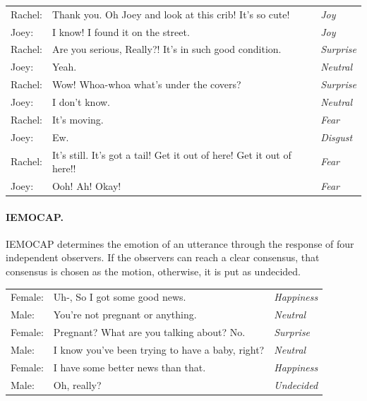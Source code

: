 \documentclass[nofilelist]{cslthse-msc}
\begin{document}
\begin{table}[H]
    \begin{pag}

    \centering
    \begin{tabular}{lll}
Rachel: & Thank you. Oh Joey and look at this crib! It's so cute! & \textit{Joy} \\
Joey: & I know! I found it on the street. & \textit{Joy} \\
Rachel: & Are you serious, Really?! It's in such good condition. & \textit{Surprise} \\
Joey: & Yeah. & \textit{Neutral} \\
Rachel: & Wow! Whoa-whoa what's under the covers? & \textit{Surprise} \\
Joey: & I don't know. & \textit{Neutral} \\
Rachel: & It's moving. & \textit{Fear} \\
Joey: & Ew. & \textit{Disgust} \\
Rachel: & It's still. It's got a tail! Get it out of here! Get it out of here!! & \textit{Fear} \\
Joey: & Ooh! Ah! Okay! & \textit{Fear} \\
    \end{tabular}
    \label{tab:dialogue_meld}
\end{pag}
\end{table}

\paragraph{IEMOCAP.}
IEMOCAP determines the emotion of an utterance through the response of four independent observers. If the observers can reach a clear consensus, that consensus is chosen as the motion, otherwise, it is put as undecided.  

\begin{table}[H]
    \begin{pag}

    \centering
    \begin{tabular}{lll}
Female: & Uh-, So I got some good news. & \textit{Happiness} \\
Male: & You're not pregnant or anything. & \textit{Neutral} \\
Female: & Pregnant? What are you talking about? No. & \textit{Surprise} \\
Male: & I know you've been trying to have a baby, right? & \textit{Neutral} \\
Female: & I have some better news than that. & \textit{Happiness} \\
Male: & Oh, really? & \textit{Undecided} \\
    \end{tabular}
    \label{tab:dialogue_iemocap}
\end{pag}
\end{table}
\end{document}
